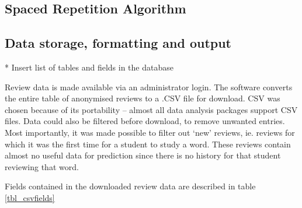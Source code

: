 \subsection{Spaced Repetition Algorithm}
\subsection{Data storage, formatting and output}

* Insert list of tables and fields in the database %


Review data is made available via an administrator login. The software converts the entire
table of anonymised reviews to a .CSV file for download. CSV was chosen because of its portability --
almost all data analysis packages support CSV files. Data could also be filtered before download, 
to remove unwanted entries. Most importantly, it was made possible to filter out `new' reviews, ie.
reviews for which it was the first time for a student to study a word. These reviews contain almost
no useful data for prediction since there is no history for that student reviewing that word.

Fields contained in the downloaded review data are described in table \ref{tbl_csvfields}

